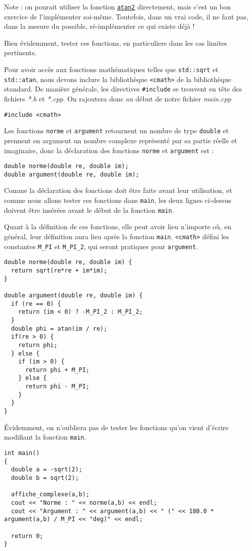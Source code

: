 \documentclass{book}
\newcommand{\inline}[1]{\texttt{#1}}
\def\filename{\emph}
\begin{document}
Note : on pourait utiliser la fonction \href{https://fr.wikipedia.org/wiki/Atan2}{\texttt{atan2}} directement, mais c'est un bon exercice de l'implémenter soi-même. Toutefois, dans un vrai code, il ne faut pas, dans la mesure du possible, ré-implémenter ce qui existe déjà !

Bien évidemment, tester ces fonctions, en particuliers dans les cas limites pertinents.

\begin{correction}
Pour avoir accès aux fonctions mathématiques telles que \inline{std::sqrt} et \inline{std::atan}, nous devons inclure la bibliothèque \inline{<cmath>} de la bibliothèque standard. De manière générale, les directives \texttt{#include} se trouvent en tête des fichiers \filename{*.h} et \filename{*.cpp}. On rajoutera donc au début de notre fichier \filename{main.cpp}
\begin{verbatim}
#include <cmath>
\end{verbatim}
Les fonctions \inline{norme} et \inline{argument} retournent un nombre de type \inline{double} et prennent en argument un nombre complexe représenté par sa  partie réelle et imaginaire, donc la déclaration des fonctions \inline{norme} et \inline{argument} est :
\begin{verbatim}
double norme(double re, double im);
double argument(double re, double im);
\end{verbatim}
Comme la déclaration des fonctions doit être faite avant leur utilisation, et comme nous allons tester ces fonctions dans \inline{main}, les deux lignes ci-dessus doivent être insérées avant le début de la fonction \inline{main}.

Quant à la définition de ces fonctions, elle peut avoir lieu n'importe où, en général, leur définition aura lieu après la fonction \inline{main}. \inline{<cmath>} défini les constantes \inline{M_PI} et \inline{M_PI_2}, qui seront pratiques pour \inline{argument}.
\begin{verbatim}
double norme(double re, double im) {
  return sqrt(re*re + im*im);
}

double argument(double re, double im) {
  if (re == 0) {
    return (im < 0) ? -M_PI_2 : M_PI_2;
  }
  double phi = atan(im / re);
  if(re > 0) {
    return phi;
  } else {
    if (im > 0) {
      return phi + M_PI;
    } else {
      return phi - M_PI;
    }
  }
}
\end{verbatim}

Évidemment, on n'oubliera pas de tester les fonctions qu'on vient d'écrire modifiant la fonction \inline{main}.
\begin{verbatim}
int main()
{
  double a = -sqrt(2);
  double b = sqrt(2);

  affiche_complexe(a,b);
  cout << "Norme : " << norme(a,b) << endl;
  cout << "Argument : " << argument(a,b) << " (" << 180.0 * argument(a,b) / M_PI << "deg)" << endl;

  return 0;
}
\end{verbatim}
\end{correction}
\end{document}
